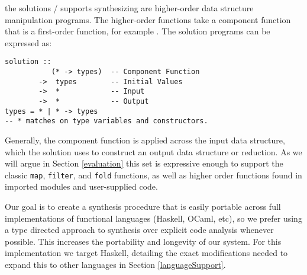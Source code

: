 the solutions \ourTool/ supports synthesizing are higher-order data structure manipulation programs.
The higher-order functions take a component function that is a first-order function, for example \codeinline{(+)}.
The solution programs can be expressed as:

\begin{lstlisting}
solution ::
           (* -> types)  -- Component Function
        ->  types        -- Initial Values
        ->  *            -- Input
        ->  *            -- Output
types = * | * -> types
-- * matches on type variables and constructors.
\end{lstlisting}

Generally, the component function is applied across the \textsf{input} data structure, which the \textsf{solution} uses to construct an \textsf{output} data structure or reduction. As we will argue in Section \ref{evaluation} this set is expressive enough to support the classic \texttt{map}, \texttt{filter}, and \texttt{fold} functions, as well as higher order functions found in imported modules and user-supplied code.

Our goal is to create a synthesis procedure that is easily portable across full implementations of functional languages (Haskell, OCaml, etc), so we prefer using a type directed approach to synthesis over explicit code analysis whenever possible. This increases the portability and longevity of our system. For this implementation we target Haskell, detailing the exact modifications needed to expand this to other languages in Section \ref{languageSupport}.


